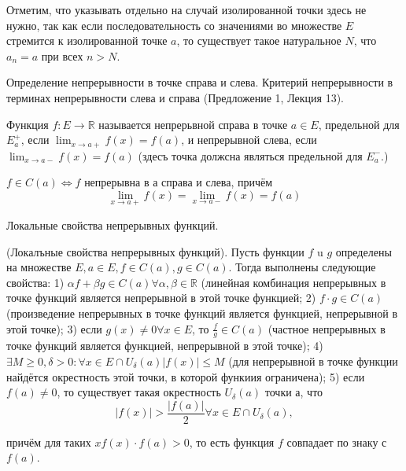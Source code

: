 Отметим, что указывать отдельно на случай изолированной точки здесь не нужно, так как если последовательность со значениями во множестве $E$ стремится к изолированной точке $a$, то существует такое натуральное $N$, что $a_n=a$ при всех $n>N$.

\newpage
\begin{problem}
Определение непрерывности в точке справа и слева. Критерий непрерывности в терминах непрерывности слева и справа (Предложение 1, Лекция 13).
\end{problem}

\begin{definition}
    Функция $f: E \rightarrow \mathbb{R}$ называется непрерьвной справа в точке $a \in E$, предельной для $E_a^{+}$, если $\lim _{x \rightarrow a+} f(x)=f(a)$, и непрерывной слева, если $\lim _{x \rightarrow a-} f(x)=f(a)$ (здесъ точка должсна являться предельной для $E_a^{-}$.)
\end{definition}

\begin{proposition}
    $f \in C(a) \Leftrightarrow f$ непрерывна в а справа и слева, причём
    $$
        \lim _{x \rightarrow a+} f(x)=\lim _{x \rightarrow a-} f(x)=f(a)
    $$
\end{proposition}

\newpage
\begin{problem}
Локальные свойства непрерывных функций.
\end{problem}

\begin{proposition}
    (Локалъные свойства непрерывных функций). Пусть функции $f$ u $g$ определены на множестве $E, a \in E, f \in C(a), g \in C(a)$. Тогда выполнены следующие свойства:
    1) $\alpha f+\beta g \in C(a) \forall \alpha, \beta \in \mathbb{R}$ (линейная комбинация непрерывных в точке функций является непрерывной в этой точке функцией;
    2) $f \cdot g \in C(a)$ (произведение непрерывных в точке функций является функцией, непрерывной в этой точке);
    3) если $g(x) \neq 0 \forall x \in E$, то $\frac{f}{g} \in C(a)$ (частное непрерывных в точке функций является функцией, непрерывной в этой точке);
    4) $\exists M \geq 0, \delta>0: \forall x \in E \cap U_\delta(a)|f(x)| \leq M$ (для непрерывной в точке функции найдётся окрестность этой точки, в которой функиия ограничена);
    5) если $f(a) \neq 0$, то существует такая окрестность $U_\delta(a)$ точки а, что
    $$
        |f(x)|>\frac{|f(a)|}{2} \forall x \in E \cap U_\delta(a),
    $$

    причём для таких $x f(x) \cdot f(a)>0$, то есть функция $f$ совпадает по знаку с $f(a)$.
\end{proposition}


